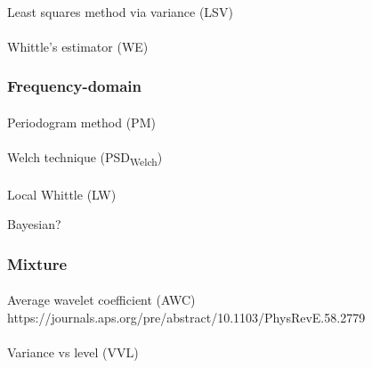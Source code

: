 \documentclass[
  sn-vancouver,
  Numbered,
  referee,
  lineno]{sn-jnl}
\makeatletter
\let\oldparagraph\paragraph
\renewcommand{\paragraph}{
    \@ifstar
      \xxxParagraphStar
      \xxxParagraphNoStar
  }
\newcommand{\xxxParagraphStar}[1]{\oldparagraph*{#1}\mbox{}}
\newcommand{\xxxParagraphNoStar}[1]{\oldparagraph{#1}\mbox{}}
\makeatother
\begin{document}
\paragraph{Least squares method via variance
(LSV)}\label{least-squares-method-via-variance-lsv}

\paragraph{Whittle's estimator (WE)}\label{whittles-estimator-we}

\subsubsection{Frequency-domain}\label{frequency-domain}

\paragraph{Periodogram method (PM)}\label{periodogram-method-pm}

\paragraph{\texorpdfstring{Welch technique
(PSD\textsubscript{Welch})}{Welch technique (PSDWelch)}}\label{welch-technique-psdwelch}

\paragraph{Local Whittle (LW)}\label{local-whittle-lw}

Bayesian?

\subsubsection{Mixture}\label{mixture}

\paragraph{Average wavelet coefficient (AWC)
https://journals.aps.org/pre/abstract/10.1103/PhysRevE.58.2779}\label{average-wavelet-coefficient-awc-httpsjournals.aps.orgpreabstract10.1103physreve.58.2779}

\paragraph{Variance vs level (VVL)}\label{variance-vs-level-vvl}
\end{document}
